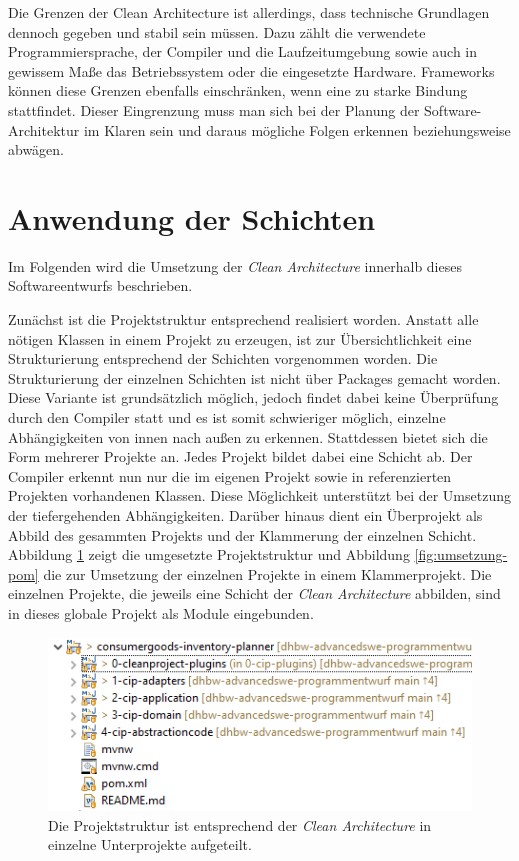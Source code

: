 Die Grenzen der Clean Architecture ist allerdings, dass technische Grundlagen dennoch gegeben und stabil sein müssen.
Dazu zählt die verwendete Programmiersprache, der Compiler und die Laufzeitumgebung sowie auch in gewissem Maße das Betriebssystem oder die eingesetzte Hardware.
Frameworks können diese Grenzen ebenfalls einschränken, wenn eine zu starke Bindung stattfindet.
Dieser Eingrenzung muss man sich bei der Planung der Software-Architektur im Klaren sein und daraus mögliche Folgen erkennen beziehungsweise abwägen.

\section{Anwendung der Schichten}
Im Folgenden wird die Umsetzung der \textit{Clean Architecture} innerhalb dieses Softwareentwurfs beschrieben.

Zunächst ist die Projektstruktur entsprechend realisiert worden.
Anstatt alle nötigen Klassen in einem Projekt zu erzeugen, ist zur Übersichtlichkeit eine Strukturierung entsprechend der Schichten vorgenommen worden.
Die Strukturierung der einzelnen Schichten ist nicht über Packages gemacht worden.
Diese Variante ist grundsätzlich möglich, jedoch findet dabei keine Überprüfung durch den Compiler statt und es ist somit schwieriger möglich, einzelne Abhängigkeiten von innen nach außen zu erkennen.
Stattdessen bietet sich die Form mehrerer Projekte an.
Jedes Projekt bildet dabei eine Schicht ab.
Der Compiler erkennt nun nur die im eigenen Projekt sowie in referenzierten Projekten vorhandenen Klassen.
Diese Möglichkeit unterstützt bei der Umsetzung der tiefergehenden Abhängigkeiten.
Darüber hinaus dient ein Überprojekt als Abbild des gesammten Projekts und der Klammerung der einzelnen Schicht.
Abbildung \ref{fig:projektstruktur} zeigt die umgesetzte Projektstruktur und Abbildung \ref{fig:umsetzung-pom} die \href{https://github.com/lucasmerkel/dhbw-advancedswe-programmentwurf/blob/307ca1a197b9c875b08a17ac88b76d97980d5f85/swe_programmentwurf/consumergoods-inventory-planner/pom.xml#L20}{} zur Umsetzung der einzelnen Projekte in einem Klammerprojekt.
Die einzelnen Projekte, die jeweils eine Schicht der \textit{Clean Architecture} abbilden, sind in dieses globale Projekt als Module eingebunden.

\begin{figure}[H]
	\centering
	\includegraphics[width=1.0\textwidth]{Bilder/projektstruktur.PNG}
	\caption[Aufteilung der Projektstruktur entsprechend \textit{Clean Architecture}.]{Die Projektstruktur ist entsprechend der \textit{Clean Architecture} in einzelne Unterprojekte aufgeteilt.}
	\label{fig:projektstruktur}
\end{figure}

